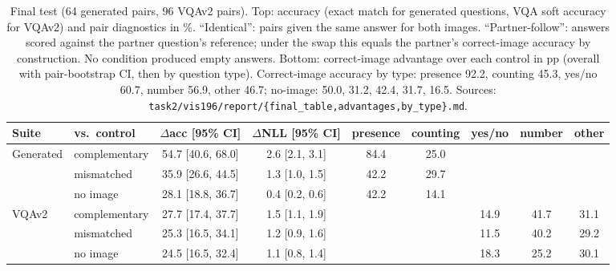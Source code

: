 \documentclass{article}
\begin{document}
\begin{table}[t]
\vspace{4pt}
\begin{adjustbox}{max width=\linewidth}\begin{tabular}{llccccccc}\toprule
Suite & vs.\ control & $\Delta$acc [95\% CI] & $\Delta$NLL [95\% CI] & presence & counting & yes/no & number & other \\\midrule
Generated & complementary & 54.7 [40.6, 68.0] & 2.6 [2.1, 3.1] & 84.4 & 25.0 & & & \\
          & mismatched    & 35.9 [26.6, 44.5] & 1.3 [1.0, 1.5] & 42.2 & 29.7 & & & \\
          & no image      & 28.1 [18.8, 36.7] & 0.4 [0.2, 0.6] & 42.2 & 14.1 & & & \\
VQAv2     & complementary & 27.7 [17.4, 37.7] & 1.5 [1.1, 1.9] & & & 14.9 & 41.7 & 31.1 \\
          & mismatched    & 25.3 [16.5, 34.1] & 1.2 [0.9, 1.6] & & & 11.5 & 40.2 & 29.2 \\
          & no image      & 24.5 [16.5, 32.4] & 1.1 [0.8, 1.4] & & & 18.3 & 25.2 & 30.1 \\\bottomrule
\end{tabular}\end{adjustbox}
\caption{Final test (64 generated pairs, 96 VQAv2 pairs). Top: accuracy (exact match for generated questions, VQA soft accuracy for VQAv2) and pair diagnostics in \%. ``Identical'': pairs given the same answer for both images. ``Partner-follow'': answers scored against the partner question's reference; under the swap this equals the partner's correct-image accuracy by construction. No condition produced empty answers. Bottom: correct-image advantage over each control in pp (overall with pair-bootstrap CI, then by question type). Correct-image accuracy by type: presence 92.2, counting 45.3, yes/no 60.7, number 56.9, other 46.7; no-image: 50.0, 31.2, 42.4, 31.7, 16.5. Sources: \texttt{task2/vis196/report/\{final\_table,advantages,by\_type\}.md}.}\label{tab:t2}
\end{table}
\end{document}
